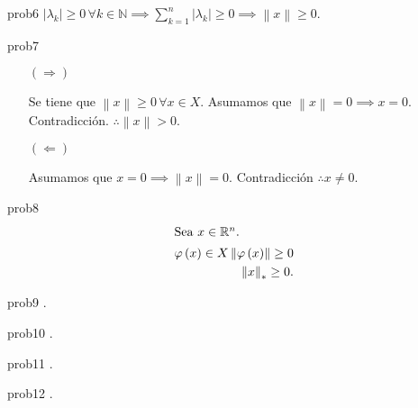 \begin{sol}{prob6}
    \begin{math}
        \left|
        \lambda_{k}
        \right|\geq
        0\,\forall
        k\in\mathbb{N}\implies
        \sum_{k=1}^{n}
        \left|
        \lambda_{k}
        \right|\geq
        0\implies
        \left\|
        x
        \right\|\geq
        0
    \end{math}.
\end{sol}

\begin{sol}{prob7}
    \leavevmode
    \begin{itemize}
        \item[$\left(\Rightarrow\right)$]

              Se tiene que $\left\|x\right\|\geq 0\,\forall x\in X$.
              Asumamos que $\left\|x\right\|=0\implies x=0$.
              Contradicción.
              $\therefore \left\|x\right\|>0$.

        \item[$\left(\Leftarrow\right)$]

              Asumamos que
              \begin{math}
                  x=
                  0\implies
                  \left\|x\right\|=
                  0
              \end{math}.
              Contradicción
              $\therefore x\neq0$.
    \end{itemize}
\end{sol}

\begin{sol}{prob8}
    \begin{align*}
        \shortintertext{Sea $x\in\mathbb{R}^{n}$.}
        \varphi\left(x\right)\in X
        \left\|\varphi\left(x\right)\right\|\geq
        0 \\
        {\left\|x\right\|}_{\ast}\geq
        0.
    \end{align*}
\end{sol}

\begin{sol}{prob9}
    .
\end{sol}

\begin{sol}{prob10}
    .
\end{sol}

\begin{sol}{prob11}
    .
\end{sol}

\begin{sol}{prob12}
    .
\end{sol}

